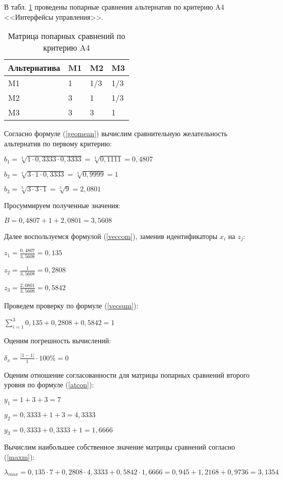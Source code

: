 В табл. \ref{interf} проведены попарные сравнения альтернатив по критерию A4 <<Интерфейсы управления>>.
\begin{table}[H]
  \caption{Матрица попарных сравнений по критерию A4}\label{interf}
  \begin{tabular}{|l|l|l|l|}
  \hline Альтернатива & M1 & M2 & M3 \\
  \hline M1 & 1 & 1/3 & 1/3 \\
  \hline M2 & 3 & 1 & 1/3 \\
  \hline M3 & 3 & 3 & 1 \\
  \hline
  \end{tabular}
\end{table}

Согласно формуле (\ref{geomean}) вычислим сравнительную желательность альтернатив по первому критерию:

$b_1 = \sqrt[3]{1 \cdot 0,3333 \cdot 0,3333} = \sqrt[3]{0,1111} = 0,4807$

$b_2 = \sqrt[3]{3 \cdot 1 \cdot 0,3333} = \sqrt[3]{0,9999} = 1$

$b_3 = \sqrt[3]{3 \cdot 3 \cdot 1} = \sqrt[3]{9} = 2,0801$

Просуммируем полученные значения:

$B = 0,4807 + 1 + 2,0801 = 3,5608$

Далее воспользуемся формулой (\ref{veccom}), заменив идентификаторы $x_i$ на $z_j$:

$z_1 = \frac{0,4807}{3,5608} = 0,135$

$z_2 = \frac{1}{3,5608} = 0,2808$

$z_3 = \frac{2,0801}{3,5608} = 0,5842$

Проведем проверку по формуле (\ref{vecsum}):

$\sum_{i=1}^{3} 0,135 + 0,2808 + 0,5842 = 1$

Оценим погрешность вычислений:

$\delta_{x} = \frac{|1 - 1|}{1} \cdot 100\% = 0$

Оценим отношение согласованности для матрицы попарных сравнений второго уровня по формуле (\ref{atcon}):

$y_1 = 1 + 3 + 3 = 7$

$y_2 = 0,3333 + 1 + 3 = 4,3333$

$y_3 = 0,3333 + 0,3333 + 1 = 1,6666$

Вычислим наибольшее собственное значение матрицы сравнений согласно (\ref{maxm}):

$\lambda_{max} = 0,135 \cdot 7 + 0,2808 \cdot 4,3333 + 0,5842 \cdot 1,6666 = 0,945 + 1,2168 + 0,9736 = 3,1354$

